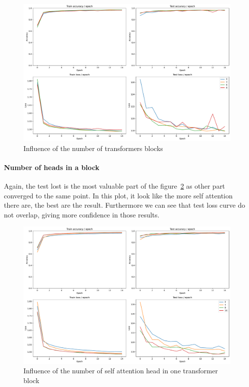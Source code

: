 \documentclass{article}
\theoremstyle{plain}%
\theoremstyle{definition}
\theoremstyle{remark}
\begin{document}
\begin{figure}[H]
    \centering
    \includegraphics*[width=\textwidth]{figs/Transformers/nb_block_influence.pdf}
    \caption{Influence of the number of transformers blocks}
    \label{fig:nb_block_influence}
\end{figure}

\paragraph{Number of heads in a block}
Again, the test lost is the most valuable part of the figure~\ref*{fig:num_heads_influence} as other part converged to the same point. In this plot, it look like the more self attention there are, the best are the result. Furthermore we can see that test loss curve do not overlap, giving more confidence in those results.

\begin{figure}[H]
    \centering
    \includegraphics*[width=\textwidth]{figs/Transformers/num_heads_influence.pdf}
    \caption{Influence of the number of self attention head in one transformer block }
    \label{fig:num_heads_influence}
\end{figure}
\end{document}
